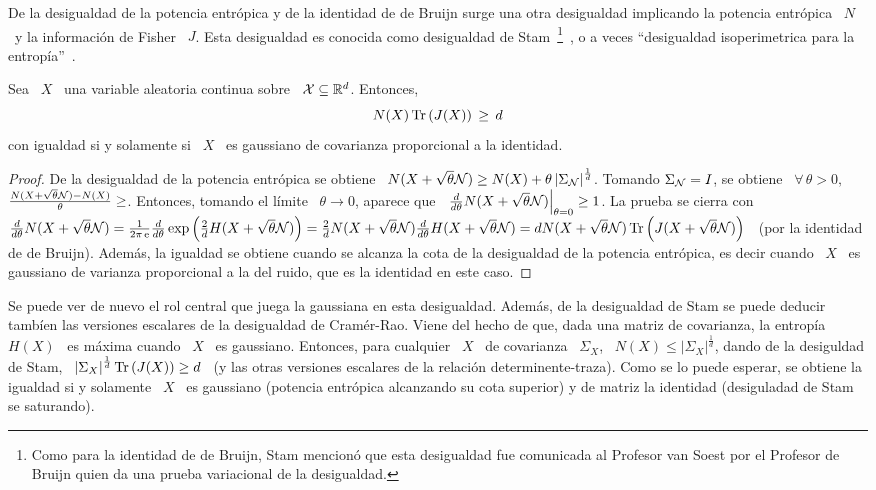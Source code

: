 De la  desigualdad de  la potencia entr\'opica  y de  la identidad de  de Bruijn
surge  una otra  desigualdad implicando  la potencia  entr\'opica \  $N$ \  y la
informaci\'on de Fisher \ $J$.  Esta desigualdad es conocida como desigualdad de
Stam~\footnote{Como para  la identidad  de de Bruijn,  Stam mencion\'o  que esta
  desigualdad fue  comunicada al  Profesor van Soest  por el Profesor  de Bruijn
  quien  da una  prueba variacional  de la  desigualdad.}~\cite{CovTho06, Rio07,
  Sta59},     o    a    veces     ``desigualdad    isoperimetrica     para    la
entrop\'ia''~\cite{WanMad04}.
%
\begin{teorema}
  Sea  \  $X$   \  una  variable  aleatoria  continua   sobre  \  $\mathcal{X}  \subseteq
  \mathbb{R}^d$. Entonces,
  \[
  N(X) \operatorname{Tr}\left( J(X) \right) \, \ge \, d
  \]
  con igualdad si y solamente si \ $X$ \ es gaussiano de covarianza proporcional
  a la identidad.
\end{teorema}
%
\begin{proof}
  De la desigualdad de la potencia entr\'opica se obtiene \ $N(X + \sqrt{\theta}
  \mathcal{N})  \ge N(X)  + \theta  \left| \Sigma_{\mathcal{N}}  \right|^{\frac1d}$. Tomando
  $\Sigma_{\mathcal{N}} =  I$, se  obtiene \ $\forall  \, \theta  > 0,$ \  $\frac{N(X +
    \sqrt{\theta} \mathcal{N}) - N(X)}{\theta}  \ge $.  Entonces, tomando el l\'imite
  \ $\theta \to 0$, aparece  que \ $\left. \frac{d}{d\theta} N(X + \sqrt{\theta}
    \mathcal{N})   \right|_{\theta  =   0}  \ge   1$.   La   prueba  se   cierra  con
  $\frac{d}{d\theta}  N(X   +  \sqrt{\theta}   \mathcal{N})  =  \frac{1}{2   \pi  \operatorname{e}}
  \frac{d}{d\theta}  \exp\left( \frac2d  H(X +  \sqrt{\theta} \mathcal{N})  \right) =
  \frac2d  N(X +  \sqrt{\theta}  \mathcal{N}) \frac{d}{d\theta}  H(X +  \sqrt{\theta}
  \mathcal{N}) = d N(X +  \sqrt{\theta} \mathcal{N}) \operatorname{Tr}\left( J(X + \sqrt{\theta} \mathcal{N})
  \right)$ \ (por la identidad de  de Bruijn).  Adem\'as, la igualdad se obtiene
  cuando se  alcanza la cota  de la desigualdad  de la potencia  entr\'opica, es
  decir cuando \ $X$ \ es gaussiano de varianza proporcional a la del ruido, que
  es la identidad en este caso.
\end{proof}
%
Se  puede  ver  de  nuevo  el  rol  central  que  juega  la  gaussiana  en  esta
desigualdad. Adem\'as, de la desigualdad  de Stam se puede deducir tamb\'ien las
versiones escalares de  la desigualdad de Cram\'er-Rao. Viene  del hecho de que,
dada una matriz de covarianza, la entrop\'ia \ $H(X)$ \ es m\'axima cuando \ $X$
\ es gaussiano.  Entonces, para cualquier  \ $X$ \ de covarianza \ $\Sigma_X$, \
$N(X) \le \left| \Sigma_X \right|^{\frac1d}$,  dando de la desiguldad de Stam, \
$\left| \Sigma_X \right|^{\frac1d} \operatorname{Tr}\left( J(X)  \right) \ge d$ \ (y las otras
versiones  escalares de  la relaci\'on  determinente-traza).  Como  se  lo puede
esperar, se  obtiene la igualdad si y  solamente \ $X$ \  es gaussiano (potencia
entr\'opica alcanzando su  cota superior) y de matriz  la identidad (desiguladad
de Stam se saturando).

